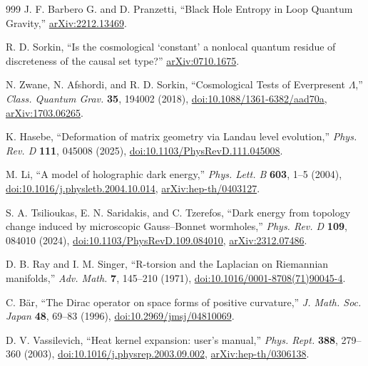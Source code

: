 \documentclass[aps,prd,reprint,nofootinbib,superscriptaddress,floatfix]{revtex4-2}
\numberwithin{equation}{section}
\theoremstyle{definition}
\theoremstyle{plain}
\begin{document}
\begin{thebibliography}{999}
J. F. Barbero G. and D. Pranzetti,
``Black Hole Entropy in Loop Quantum Gravity,''
\href{https://arxiv.org/abs/2212.13469}{arXiv:2212.13469}.

R. D. Sorkin,
``Is the cosmological `constant' a nonlocal quantum residue of discreteness of the causal set type?''
\href{https://arxiv.org/abs/0710.1675}{arXiv:0710.1675}.

N. Zwane, N. Afshordi, and R. D. Sorkin,
``Cosmological Tests of Everpresent \(\Lambda\),''
\emph{Class. Quantum Grav.} \textbf{35}, 194002 (2018),
\href{https://doi.org/10.1088/1361-6382/aad70a}{doi:10.1088/1361-6382/aad70a},
\href{https://arxiv.org/abs/1703.06265}{arXiv:1703.06265}.

K. Hasebe,
``Deformation of matrix geometry via Landau level evolution,''
\emph{Phys. Rev. D} \textbf{111}, 045008 (2025),
\href{https://doi.org/10.1103/PhysRevD.111.045008}{doi:10.1103/PhysRevD.111.045008}.




M. Li,
``A model of holographic dark energy,''
\emph{Phys. Lett. B} \textbf{603}, 1--5 (2004),
\href{https://doi.org/10.1016/j.physletb.2004.10.014}{doi:10.1016/j.physletb.2004.10.014},
\href{https://arxiv.org/abs/hep-th/0403127}{arXiv:hep-th/0403127}.

S. A. Tsilioukas, E. N. Saridakis, and C. Tzerefos,
``Dark energy from topology change induced by microscopic Gauss--Bonnet wormholes,''
\emph{Phys. Rev. D} \textbf{109}, 084010 (2024),
\href{https://doi.org/10.1103/PhysRevD.109.084010}{doi:10.1103/PhysRevD.109.084010},
\href{https://arxiv.org/abs/2312.07486}{arXiv:2312.07486}.

D. B. Ray and I. M. Singer,
``R-torsion and the Laplacian on Riemannian manifolds,''
\emph{Adv. Math.} \textbf{7}, 145--210 (1971),
\href{https://doi.org/10.1016/0001-8708(71)90045-4}{doi:10.1016/0001-8708(71)90045-4}.


C. B\"ar,
``The Dirac operator on space forms of positive curvature,''
\emph{J. Math. Soc. Japan} \textbf{48}, 69--83 (1996),
\href{https://doi.org/10.2969/jmsj/04810069}{doi:10.2969/jmsj/04810069}.

D. V. Vassilevich,
``Heat kernel expansion: user's manual,''
\emph{Phys. Rept.} \textbf{388}, 279--360 (2003),
\href{https://doi.org/10.1016/j.physrep.2003.09.002}{doi:10.1016/j.physrep.2003.09.002},
\href{https://arxiv.org/abs/hep-th/0306138}{arXiv:hep-th/0306138}.



\end{thebibliography}
\end{document}
